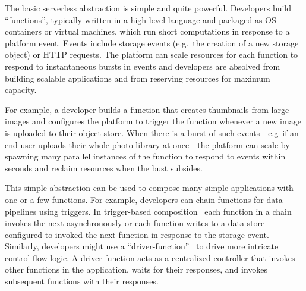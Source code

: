 
The basic serverless abstraction is simple and quite powerful. Developers build
``functions'', typically written in a high-level language and packaged as OS
containers or virtual machines, which run short computations in response to a
platform event. Events include storage events (e.g.\ the creation of a new
storage object) or HTTP requests. The platform can scale resources for each
function to respond to instantaneous bursts in events and developers are
absolved from building scalable applications and from reserving resources for
maximum capacity.

For example, a developer builds a function that creates thumbnails from large
images and configures the platform to trigger the function whenever a new image
is uploaded to their object store. When there is a burst of such events---e.g\
if an end-user uploads their whole photo library at once---the platform can
scale by spawning many parallel instances of the function to respond to events
within seconds and reclaim resources when the bust subsides.

This simple abstraction can be used to compose many simple applications with
one or a few functions. For example, developers can chain functions for data
pipelines using triggers. In trigger-based composition~\cite{netherite} each
function in a chain invokes the next asynchronously or each function writes to
a data-store configured to invoked the next function in response to the
storage event. Similarly, developers might use a
``driver-function''~\cite{beldi} to drive more intricate control-flow logic. A
driver function acts as a centralized controller that invokes other functions
in the application, waits for their responses, and invokes subsequent
functions with their responses.

